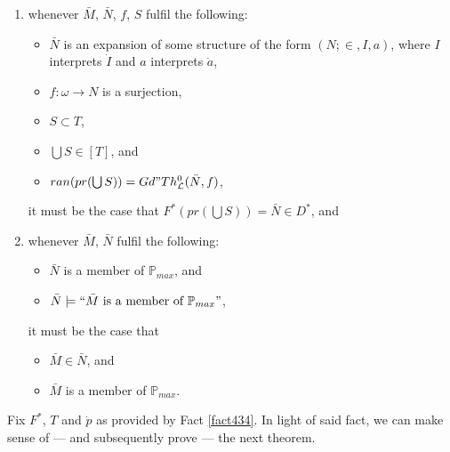 \documentclass[12pt]{article}
\numberwithin{equation}{section}
\begin{document}
\begin{fact}
\begin{enumerate}[label=(4.34.\arabic*), leftmargin=50pt]
    \item\label{4346b} whenever $\bar{M}$, $\bar{N}$, $f$, $S$ fulfil the following:
    \begin{itemize}
        \item $\bar{N}$ is an expansion of some structure of the form $(N; \in, I, a)$, where $I$ interprets $\dot{I}$ and $a$ interprets $\dot{a}$,
        \item $f : \omega \longrightarrow N$ is a surjection,
        \item $S \subset T$,
        \item $\bigcup S \in [T]$, and
        \item $ran(pr(\bigcup S)) = Gd" Th^0_{\mathcal{L}}(\bar{N}, f)$,
    \end{itemize}
    it must be the case that $F^*(pr(\bigcup S)) = \bar{N} \in D^*$, and
    \item\label{4346} whenever $\bar{M}$, $\bar{N}$ fulfil the following:
    \begin{itemize}
        \item $\bar{N}$ is a member of $\mathbb{P}_{max}$, and
        \item $\bar{N} \models ``\bar{M} \text{ is a member of } \mathbb{P}_{max}"$,
    \end{itemize}
    it must be the case that
    \begin{itemize}
        \item $\bar{M} \in \bar{N}$, and
        \item $\bar{M}$ is a member of $\mathbb{P}_{max}$.
    \end{itemize}
\end{enumerate}
\end{fact}

Fix $F^*$, $T$ and $\dot{p}$ as provided by Fact \ref{fact434}. In light of said fact, we can make sense of --- and subsequently prove --- the next theorem.
\end{document}
